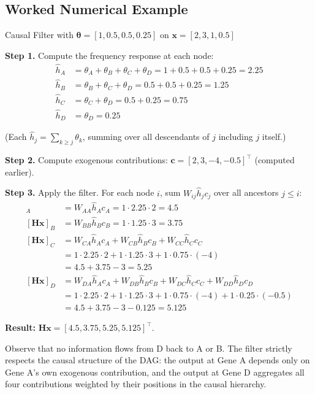 \subsection{Worked Numerical Example}

\begin{examplebox}{Causal Filter with $\boldsymbol{\theta} = [1, 0.5, 0.5, 0.25]$ on $\mathbf{x} = [2, 3, 1, 0.5]$}

\textbf{Step 1.} Compute the frequency response at each node:
\begin{align*}
    \hat{h}_A &= \theta_A + \theta_B + \theta_C + \theta_D = 1 + 0.5 + 0.5 + 0.25 = 2.25 \\
    \hat{h}_B &= \theta_B + \theta_C + \theta_D = 0.5 + 0.5 + 0.25 = 1.25 \\
    \hat{h}_C &= \theta_C + \theta_D = 0.5 + 0.25 = 0.75 \\
    \hat{h}_D &= \theta_D = 0.25
\end{align*}

(Each $\hat{h}_j = \sum_{k \ge j} \theta_k$, summing over all descendants
of $j$ including $j$ itself.)

\textbf{Step 2.} Compute exogenous contributions:
$\mathbf{c} = [2, 3, -4, -0.5]^\top$ (computed earlier).

\textbf{Step 3.} Apply the filter. For each node $i$, sum $W_{ij} \hat{h}_j c_j$
over all ancestors $j \le i$:
\begin{align*}
    [\mathbf{H}\mathbf{x}]_A &= W_{AA} \hat{h}_A c_A
        = 1 \cdot 2.25 \cdot 2 = 4.5 \\
    [\mathbf{H}\mathbf{x}]_B &= W_{BB} \hat{h}_B c_B
        = 1 \cdot 1.25 \cdot 3 = 3.75 \\
    [\mathbf{H}\mathbf{x}]_C &= W_{CA} \hat{h}_A c_A
        + W_{CB} \hat{h}_B c_B
        + W_{CC} \hat{h}_C c_C \\
        &= 1 \cdot 2.25 \cdot 2 + 1 \cdot 1.25 \cdot 3 + 1 \cdot 0.75 \cdot (-4) \\
        &= 4.5 + 3.75 - 3 = 5.25 \\
    [\mathbf{H}\mathbf{x}]_D &= W_{DA}\hat{h}_A c_A + W_{DB}\hat{h}_B c_B
        + W_{DC}\hat{h}_C c_C + W_{DD}\hat{h}_D c_D \\
        &= 1 \cdot 2.25 \cdot 2 + 1 \cdot 1.25 \cdot 3 + 1 \cdot 0.75 \cdot (-4)
           + 1 \cdot 0.25 \cdot (-0.5) \\
        &= 4.5 + 3.75 - 3 - 0.125 = 5.125
\end{align*}

\textbf{Result:} $\mathbf{H}\mathbf{x} = [4.5, 3.75, 5.25, 5.125]^\top$.

Observe that no information flows from D back to A or B. The filter strictly
respects the causal structure of the DAG: the output at Gene A depends only on
Gene A's own exogenous contribution, and the output at Gene D aggregates all
four contributions weighted by their positions in the causal hierarchy.
\end{examplebox}

